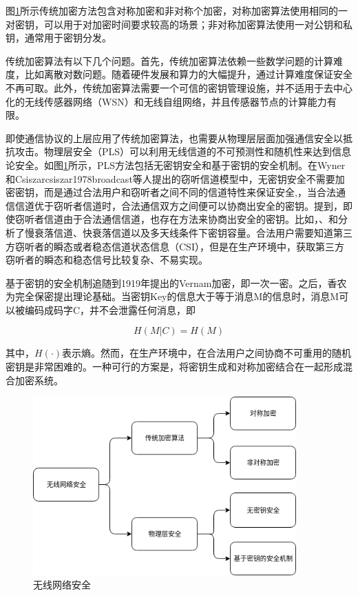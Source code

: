 \documentclass[master]{seuthesis} %
\begin{document}
\begin{Main}
图\ref{wirelss-network-security}所示传统加密方法包含对称加密和非对称个加密，对称加密算法使用相同的一对密钥，可以用于对加密时间要求较高的场景；非对称加密算法使用一对公钥和私钥，通常用于密钥分发。

传统加密算法有以下几个问题。首先，传统加密算法依赖一些数学问题的计算难度，比如离散对数问题\cite{forouzan2007cryptography}。随着硬件发展和算力的大幅提升，通过计算难度保证安全不再可取。此外，传统加密算法需要一个可信的密钥管理设施，并不适用于去中心化的无线传感器网络（WSN）和无线自组网络，并且传感器节点的计算能力有限。

即使通信协议的上层应用了传统加密算法，也需要从物理层层面加强通信安全以抵抗攻击。物理层安全（PLS）可以利用无线信道的不可预测性和随机性来达到信息论安全。如图\ref{wirelss-network-security}所示，PLS方法包括无密钥安全和基于密钥的安全机制。在Wyner\cite{wyner1975wire}和Csiszar{csiszar1978broadcast}等人提出的窃听信道模型中，无密钥安全不需要加密密钥，而是通过合法用户和窃听者之间不同的信道特性来保证安全\cite{6739367},，当合法通信信道优于窃听者信道时，合法通信双方之间便可以协商出安全的密钥。\citet{peng2017secret}提到，即使窃听者信道由于合法通信信道，也存在方法来协商出安全的密钥。比如，\citet{parada2005secrecy}、\citet{liu2009note}和\citet{li2007secret2}分析了慢衰落信道\cite{gopala2008secrecy}、快衰落信道\cite{li2007secret}以及多天线条件下密钥容量。合法用户需要知道第三方窃听者的瞬态或者稳态信道状态信息（CSI），但是在生产环境中，获取第三方窃听者的瞬态和稳态信号比较复杂、不易实现。

基于密钥的安全机制追随到1919年提出的Vernam加密，即一次一密\cite{vernam1922secret}。之后，香农为完全保密提出理论基础\cite{shannon1949communication}。当密钥Key的信息大于等于消息M的信息时，消息M可以被编码成码字C，并不会泄露任何消息，即

\begin{equation}
    H(M|C) = H(M)
\end{equation}

其中，$H(\cdot)$表示熵。然而，在生产环境中，在合法用户之间协商不可重用的随机密钥是非常困难的。一种可行的方案是，将密钥生成和对称加密结合在一起形成混合加密系统。

\begin{figure}[htbp!]
    \centering \includegraphics[width=0.9\textwidth]{images/wireless-network-security} 
    \caption{无线网络安全}
    \label{wirelss-network-security}
\end{figure}


\end{Main}
\end{document}
